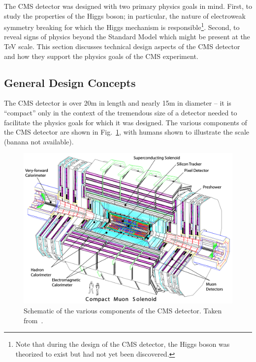 The CMS detector was designed with two primary physics goals in mind.
First, to study the properties of the Higgs boson; in particular, the nature of electroweak symmetry breaking for which the Higgs mechanism is responsible\footnote{Note that during the design of the CMS detector, the Higgs boson was theorized to exist but had not yet been discovered.}.
Second, to reveal signs of physics beyond the Standard Model which might be present at the TeV scale.
This section discusses technical design aspects of the CMS detector and how they support the physics goals of the CMS experiment.
\subsection{General Design Concepts} \label{sec:cms_overview}
The CMS detector is over 20m in length and nearly 15m in diameter -- it is ``compact'' only in the context of the tremendous size of a detector needed to facilitate the physics goals for which it was designed.
The various components of the CMS detector are shown in Fig.~\ref{fig:cms_schematic}, with humans shown to illustrate the scale (banana not available).

\begin{figure} [htbp!]
    \centering
    \includegraphics[width=0.8\linewidth]{figures/cms/cms_detector_schematic.png}
    \caption{Schematic of the various components of the CMS detector. Taken from~\cite{Chatrchyan:2008aa}.}
    \label{fig:cms_schematic}
\end{figure}

